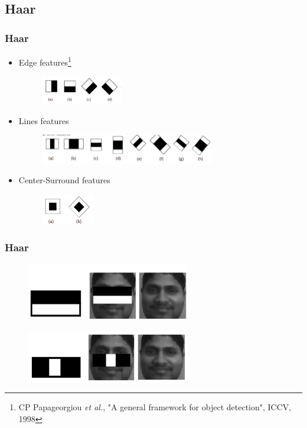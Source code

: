 \documentclass[10pt]{beamer}
\begin{document}
\subsection{Haar}  
\begin{frame}
    \frametitle{Haar}   
   \begin{itemize}
   \item Edge features\footnote{CP Papageorgiou \textit{et al.}, "A general framework for object detection", ICCV, 1998}
   \begin{figure}[!ht]
   \centering
   \includegraphics[width=1.4in]{h1.png}
   \end{figure}
   \item Lines features
   \begin{figure}[!ht]
   \centering
   \includegraphics[width=3.0in]{h2.png}
   \end{figure}
   \item Center-Surround features
   \begin{figure}[!ht]
   \centering
   \includegraphics[width=0.9in]{h3.png}
   \end{figure}
   \end{itemize}   
\end{frame}

\begin{frame}
    \frametitle{Haar} 
   \begin{figure}[!ht]
   \centering
   \includegraphics[width=2.8in]{haar1.jpg}
   \end{figure}
   \begin{figure}[!ht]
   \centering
   \includegraphics[width=2.8in]{haar2.jpg}
   \end{figure}
\end{frame}
\end{document}
